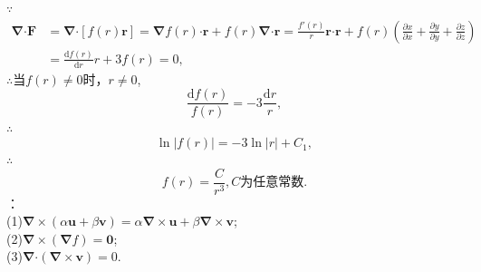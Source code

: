 \documentclass[12pt,UTF8]{ctexart}
\newcommand{\md}[1]{\mathrm d#1}
\newcommand{\pp}[2]{\frac{\partial #1}{\partial #2}}
\begin{document}
\begin{enumerate}
$\because$
\[\begin{split}
\bm\nabla\bm\cdot\bm F&=\bm\nabla\bm\cdot[f(r)\bm r]=\bm\nabla f(r)\bm\cdot\bm r+f(r)\bm\nabla\bm\cdot\bm r=\frac{f'(r)}r\bm r\bm\cdot\bm r+f(r)(\pp xx+\pp yy+\pp zz)\\
&=\frac{\md f(r)}{\md r}r+3f(r)=0,
\end{split}\]
$\therefore$当$f(r)\neq0$时，$r\neq0$,
\[\frac{\md f(r)}{f(r)}=-3\frac{\md r}r,\]
$\therefore$
\[
\ln|f(r)|=-3\ln|r|+C_1,
\]
$\therefore$
\[
f(r)=\frac C{r^3},\text{$C$为任意常数}.
\]
：\\
(1)$\bm\nabla\times(\alpha\bm u+\beta\bm v)=\alpha\bm\nabla\times\bm u+\beta\bm\nabla\times\bm v$;\\
(2)$\bm\nabla\times(\bm\nabla f)=\bm0$;\\
(3)$\bm\nabla\bm\cdot(\bm\nabla\times\bm v)=0$.


\end{enumerate}
\end{document}
